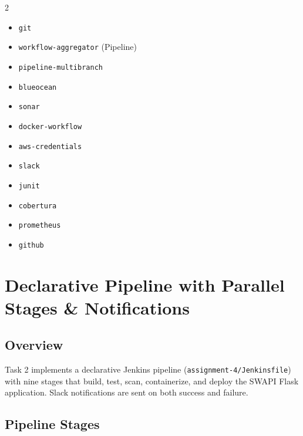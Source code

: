 \documentclass[12pt,a4paper]{article}
\begin{document}
\begin{multicols}{2}
\begin{itemize}[leftmargin=*, noitemsep, topsep=0pt]
  \item \texttt{git}
  \item \texttt{workflow-aggregator} (Pipeline)
  \item \texttt{pipeline-multibranch}
  \item \texttt{blueocean}
  \item \texttt{sonar}
  \item \texttt{docker-workflow}
  \item \texttt{aws-credentials}
  \item \texttt{slack}
  \item \texttt{junit}
  \item \texttt{cobertura}
  \item \texttt{prometheus}
  \item \texttt{github}
\end{itemize}
\end{multicols}

\newpage
\section{Declarative Pipeline with Parallel Stages \& Notifications}

\subsection{Overview}
Task 2 implements a declarative Jenkins pipeline (\texttt{assignment-4/Jenkinsfile})
with nine stages that build, test, scan, containerize, and deploy the SWAPI Flask
application. Slack notifications are sent on both success and failure.

\subsection{Pipeline Stages}
\end{document}
